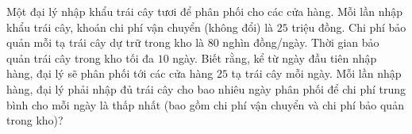 \begin{ex}%
	Một đại lý nhập khẩu trái cây tươi để phân phối cho các cửa hàng. Mỗi lần nhập khẩu trái cây, khoán chi phí vận chuyển (không đổi) là $25$ triệu đồng. Chi phí bảo quản mỗi tạ trái cây dự trữ trong kho là $80$ nghìn đồng/ngày. Thời gian bảo quản trái cây trong kho tối đa $10$ ngày. Biết rằng, kể từ ngày đầu tiên nhập hàng, đại lý sẽ phân phối tới các cửa hàng $25$ tạ trái cây mỗi ngày. Mỗi lần nhập hàng, đại lý phải nhập đủ trái cây cho bao nhiêu ngày phân phối để chi phí trung bình cho mỗi ngày là thấp nhất (bao gồm chi phí vận chuyển và chi phí bảo quản trong kho)?
\end{ex}

